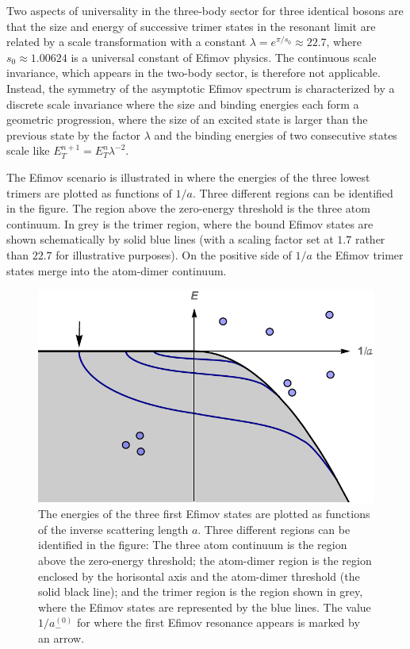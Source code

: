 Two aspects of universality in the three-body sector for three identical bosons are that the size and energy of successive trimer states in the resonant limit are related by a scale transformation with a constant $\lambda = e^{\pi/s_0} \approx 22.7$, where $s_0 \approx 1.00624$ is a universal constant of Efimov physics. The continuous scale invariance, which appears in the two-body sector, is therefore not applicable. Instead, the symmetry of the asymptotic Efimov spectrum is characterized by a discrete scale invariance where the size and binding energies each form a geometric progression, where the size of an excited state is larger than the previous state by the factor $\lambda$ and the binding energies of two consecutive states scale like $E_T^{n+1} = E_T^{n}\lambda^{-2}$.   

The Efimov scenario is illustrated in  where the energies of the three lowest trimers are plotted as functions of $1/a$. Three different regions can be identified in the figure. The region above the zero-energy threshold is the three atom continuum. In grey is the trimer region, where the bound Efimov states are shown schematically by solid blue lines (with a scaling factor set at $1.7$ rather than $22.7$ for illustrative purposes). On the positive side of $1/a$ the Efimov trimer states merge into the atom-dimer continuum.

\begin{figure}
	\centering
	\includegraphics[width=0.75\linewidth]{efimov_spec_a}
	\caption{The energies of the three first Efimov states are plotted as functions of the inverse scattering length $a$. Three different regions can be identified in the figure: The three atom continuum is the region above the zero-energy threshold; the atom-dimer region is the region enclosed by the horisontal axis and the atom-dimer threshold (the solid black line); and the trimer region is the region shown in grey, where the Efimov states are represented by the blue lines. The value $1/a_-^{(0)}$ for where the first Efimov resonance appears is marked by an arrow.}\label{fig:efimov}
\end{figure} 

